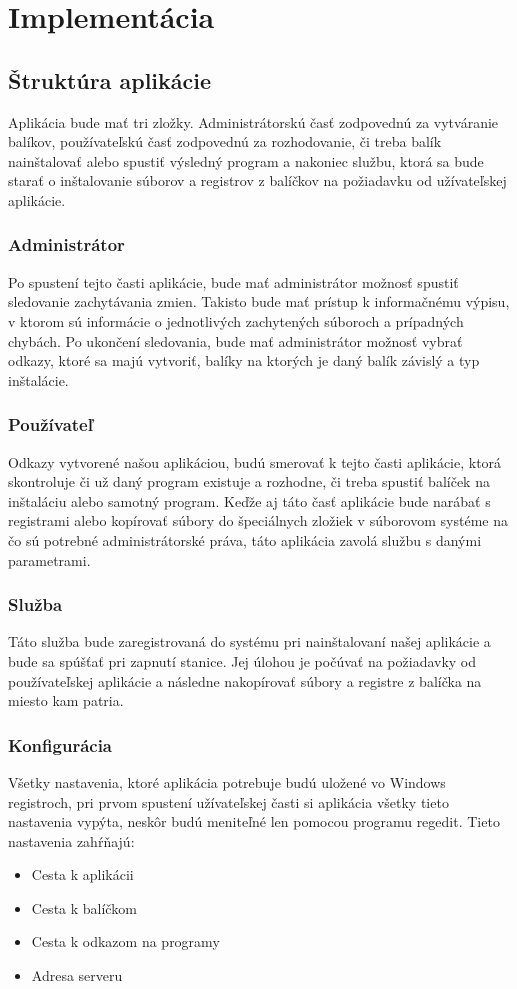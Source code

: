 \chapter{Implementácia}

\section{Štruktúra aplikácie}

Aplikácia bude mať tri zložky. Administrátorskú časť zodpovednú za vytváranie balíkov, používateľskú časť zodpovednú za rozhodovanie, či treba balík nainštalovať alebo spustiť výsledný program a nakoniec službu, ktorá sa bude starať o inštalovanie súborov a registrov z balíčkov na požiadavku od užívateľskej aplikácie.
\subsection{Administrátor}
Po spustení tejto časti aplikácie, bude mať administrátor možnosť spustiť sledovanie zachytávania zmien. Takisto bude mať prístup k informačnému výpisu, v ktorom sú informácie o jednotlivých zachytených súboroch a prípadných chybách. Po ukončení sledovania, bude mať administrátor možnosť vybrať odkazy, ktoré sa majú vytvoriť, balíky na ktorých je daný balík závislý a typ inštalácie.
\subsection{Používateľ}
Odkazy vytvorené našou aplikáciou, budú smerovať k tejto časti aplikácie, ktorá skontroluje či už daný program existuje a rozhodne, či treba spustiť balíček na inštaláciu alebo samotný program. Keďže aj táto časť aplikácie bude narábať s registrami alebo kopírovať súbory do špeciálnych zložiek v súborovom systéme na čo sú potrebné administrátorské práva, táto aplikácia zavolá službu s danými parametrami.
\subsection{Služba}
Táto služba bude zaregistrovaná do systému pri nainštalovaní našej aplikácie a bude sa spúšťať pri zapnutí stanice. Jej úlohou je počúvať na požiadavky od používateľskej aplikácie a následne nakopírovať súbory a registre z balíčka na miesto kam patria.
\subsection{Konfigurácia}
Všetky nastavenia, ktoré aplikácia potrebuje budú uložené vo Windows registroch, pri prvom spustení užívateľskej časti si aplikácia všetky tieto nastavenia vypýta, neskôr budú meniteľné len pomocou programu regedit. Tieto nastavenia zahŕňajú:
\begin{itemize}
\item Cesta k aplikácii
\item Cesta k balíčkom
\item Cesta k odkazom na programy
\item Adresa serveru
\end{itemize}

